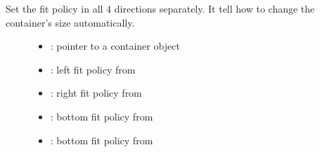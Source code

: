 \documentclass[letterpaper,10pt,english]{sphinxmanual}
\begin{document}
\begin{fulllineitems}
\label{\detokenize{object-types/cont:_CPPv416lv_cont_set_fit4P8lv_obj_t8lv_fit_t8lv_fit_t8lv_fit_t8lv_fit_t}}%
\pysigstartmultiline
{}\label{\detokenize{object-types/cont:lv__cont_8h_1a027f2c022da3ad88dc1c5f3df3994b44}}%
\pysigstopmultiline
Set the fit policy in all 4 directions separately. It tell how to change the container’s size automatically. \begin{description}
\item[{}] \leavevmode\begin{itemize}
\item {} 
: pointer to a container object 

\item {} 
: left fit policy from  

\item {} 
: right fit policy from  

\item {} 
: bottom fit policy from  

\item {} 
: bottom fit policy from  

\end{itemize}

\end{description}


\end{fulllineitems}

\end{document}
